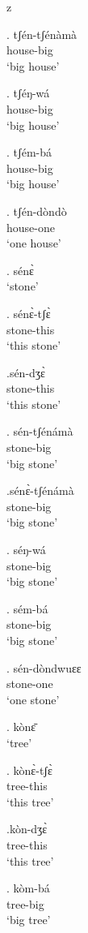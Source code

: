 z   \documentclass{assets/fieldnotes}
\begin{document}
\exg. tʃén-tʃénàmà\\
house-big\\
`big house'

\exg. tʃéŋ-wá\\
house-big\\
`big house'

\exg. tʃém-bá\\
house-big\\
`big house'

\exg. tʃén-dòndò\\
house-one\\
`one house'


\ex. sénɛ̀\\
`stone'

\exg. sénɛ̀-tʃɛ̀\\
stone-this\\
`this stone' 

\exg.sén-dʒɛ̀\\
stone-this\\
`this stone' 


\exg. sén-tʃénámà\\
stone-big\\
`big stone'

\exg.sénɛ̀-tʃénámà\\
stone-big\\
`big stone'

\exg. séŋ-wá\\
stone-big\\
`big stone'

\exg. sém-bá\\
stone-big\\
`big stone'

\exg. sén-dòndwuɛɛ\\
stone-one\\
`one stone'

\ex. kònɛ̄\\
`tree'

\exg.  kònɛ̀-tʃɛ̀\\
tree-this\\
`this tree'

\exg.kòn-dʒɛ̀\\
tree-this\\
`this tree'

\exg. kòm-bá\\
tree-big\\
`big tree'
\end{document}
